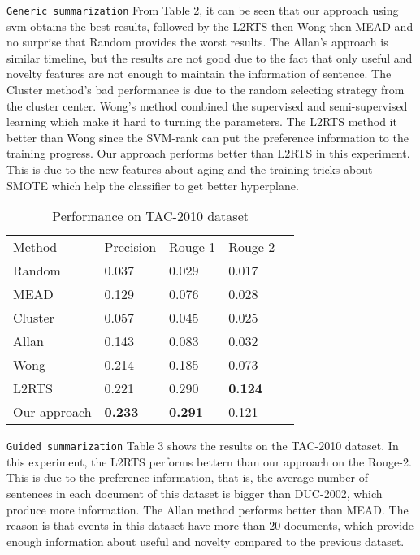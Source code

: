 \documentclass{acm_proc_article-sp}
\begin{document}
\texttt{Generic summarization} From Table 2, it can be seen that our approach using svm obtains the best results, followed by the L2RTS then Wong then MEAD and no surprise that Random provides the worst results. 
The Allan's approach is similar timeline, but the results are not good due to the fact that only useful and novelty features are not enough to maintain the information of sentence. 
The Cluster method's bad performance is due to the random selecting strategy from the cluster center.
Wong's method combined the supervised and semi-supervised learning which make it hard to turning the parameters.
The L2RTS method it better than Wong since the SVM-rank can put the preference information to the training progress.
Our approach performs better than L2RTS in this experiment. This is due to the new features about aging and the training tricks about SMOTE which help the classifier to get better hyperplane.


\begin{table}
\caption{Performance on TAC-2010 dataset }
\centering
\begin{tabular}{lllll}
\hline\noalign{\smallskip}
Method   &  Precision   & Rouge-1  &Rouge-2  \\
\noalign{\smallskip}
\hline
\noalign{\smallskip}
Random &  0.037           &      0.029                &  0.017									\\
MEAD    &	0.129			& 		0.076	 			&	0.028					 				\\
Cluster	&	0.057			&		0.045				&	0.025				 				     \\
Allan		&	0.143			&		0.083				&	0.032						 			\\
Wong		&	0.214			&		0.185				&	0.073									\\
L2RTS	&	0.221			&		0.290				&	\textbf{0.124}					 	\\
Our approach	&	\textbf{0.233}	&	\textbf{0.291}				&	0.121		          \\
\hline
\end{tabular}
\end{table}

\texttt{Guided summarization} Table 3 shows the results on the TAC-2010 dataset.
In this experiment, the L2RTS performs bettern than our approach on the Rouge-2.
This is due to the preference information, that is, the average number of sentences in each document of this dataset is bigger than DUC-2002, which produce more information.
The Allan method performs better than MEAD.
The reason is that events in this dataset have more than 20 documents, which provide enough information about useful and novelty compared to the previous dataset.
\end{document}
